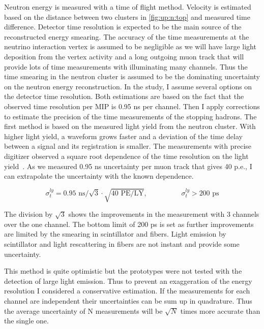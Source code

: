 \documentclass[main.tex]{subfiles}
\begin{document}
Neutron energy is measured with a time of flight method. Velocity is estimated based on the distance between two clusters in \autoref{fig:up:n:top} and measured time difference. Detector time resolution is expected to be the main source of the reconstructed energy smearing. The accuracy of the time measurements at the neutrino interaction vertex is assumed to be negligible as we will have large light deposition from the vertex activity and a long outgoing muon track that will provide lots of time measurements with illuminating many channels. Thus the time smearing in the neutron cluster is assumed to be the dominating uncertainty on the neutron energy reconstruction. In the study, I assume several options on the detector time resolution. Both estimations are based on the fact that the observed time resolution per MIP is 0.95 ns per channel. Then I apply corrections to estimate the precision of the time measurements of the stopping hadrons. The first method is based on the measured light yield from the neutron cluster. With higher light yield, a waveform grows faster and a deviation of the time delay between a signal and its registration is smaller. The measurements with precise digitizer observed a square root dependence of the time resolution on the light yield~\cite{Niemann2010}. As we measured 0.95 ns uncertainty per muon track that gives 40 p.e., I can extrapolate the uncertainty with the known dependence.

\begin{equation}
\label{eq:up:n:ly}
	\sigma^{ly}_t=0.95\text{ ns}/\sqrt{3}\cdot\sqrt{40 \text{ PE/LY}}, \hspace{2cm} \sigma^{ly}_t>200\text{ ps}
\end{equation}

The division by $\sqrt{3}$ shows the improvements in the measurement with 3 channels over the one channel. The bottom limit of 200 ps is set as further improvements are limited by the smearing in scintillator and fibers. Light emission by scintillator and light rescattering in fibers are not instant and provide some uncertainty.

This method is quite optimistic but the prototypes were not tested with the detection of large light emission. Thus to prevent an exaggeration of the energy resolution I considered a conservative estimation. If the measurements for each channel are independent their uncertainties can be sum up in quadrature. Thus the average uncertainty of N measurements will be $\sqrt{N}$ times more accurate than the single one.
\end{document}
